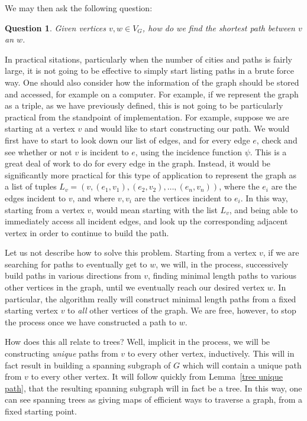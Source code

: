 \documentclass[12pt]{report}
\theoremstyle{plain}
\newtheorem{question}[thm]{Question}
\begin{document}
We may then ask the following question:
\begin{question}
Given vertices $v, w \in V_G$, how do we find the shortest path between $v$
an $w$.
\end{question}
In practical sitations, particularly when the number of cities and paths is
fairly large, it is not going to be effective to simply start listing paths
in a brute force way. One should also consider how the information of the
graph should be stored and accessed, for example on a computer. For
example, if we represent the graph as a triple, as we have previously
defined, this is not going to be particularly practical from the standpoint
of implementation. For example, suppose we are starting at a vertex $v$ and
would like to start constructing our path. We would first have to start to
look down our list of edges, and for every edge $e$, check and see whether
or not $v$ is incident to $e$, using the incidence function $\psi$. This is
a great deal of work to do for every edge in the graph. Instead, it would
be significantly more 
practical for this type of application to represent the graph as a list
of tuples $L_v = (v, (e_1, v_1), (e_2, v_2), \ldots, (e_n, v_n))$, where the
$e_i$ are the edges incident to $v$, and where $v, v_i$ are the vertices
incident to $e_i$. In this way, starting from a vertex $v$, would mean
starting with the list $L_v$, and being able to immediately access all
incident edges, and look up the corresponding adjacent vertex in order to
continue to build the path.

Let us not describe how to solve this problem. Starting from a vertex $v$,
if we are searching for paths to eventually get to $w$, we will, in the
process, successively build paths in various directions from $v$, finding
minimal length paths to various other vertices in the graph, until we
eventually reach our desired vertex $w$. In particular, the algorithm
really will construct minimal length paths from a fixed starting vertex $v$
to \textit{all} other vertices of the graph. We are free, however, to stop
the process once we have constructed a path to $w$.

How does this all relate to trees? Well, implicit in the process, we will
be constructing \textit{unique} paths from $v$ to every other vertex,
inductively. This will in fact result in building a spanning subgraph of
$G$ which will contain a unique path from $v$ to every other vertex. It
will follow quickly from Lemma~\ref{tree unique path}, that the resulting
spanning subgraph will in fact be a tree. In this way, one can see spanning
trees as giving maps of efficient ways to traverse a graph, from a fixed
starting point.
\end{document}
